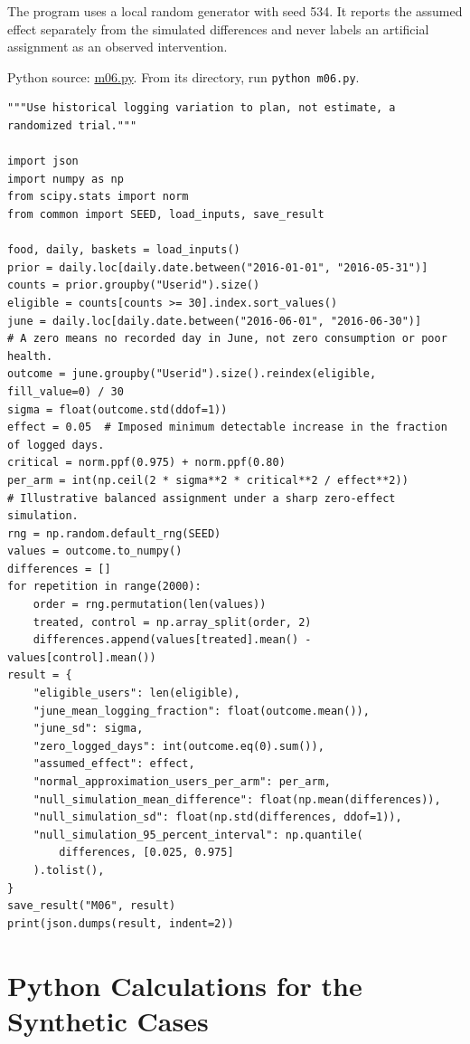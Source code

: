 The program uses a local random generator with seed 534. It reports the
assumed effect separately from the simulated differences and never
labels an artificial assignment as an observed intervention.

\FloatBarrier
{}
Python source:
\href{../03_Data_and_Code/mHealth/recurring_examples/m06.py}{m06.py}.
From its directory, run \texttt{python\ m06.py}.

\begin{Verbatim}[breaklines,breakanywhere,fontsize=\small]
"""Use historical logging variation to plan, not estimate, a randomized trial."""

import json
import numpy as np
from scipy.stats import norm
from common import SEED, load_inputs, save_result

food, daily, baskets = load_inputs()
prior = daily.loc[daily.date.between("2016-01-01", "2016-05-31")]
counts = prior.groupby("Userid").size()
eligible = counts[counts >= 30].index.sort_values()
june = daily.loc[daily.date.between("2016-06-01", "2016-06-30")]
# A zero means no recorded day in June, not zero consumption or poor health.
outcome = june.groupby("Userid").size().reindex(eligible, fill_value=0) / 30
sigma = float(outcome.std(ddof=1))
effect = 0.05  # Imposed minimum detectable increase in the fraction of logged days.
critical = norm.ppf(0.975) + norm.ppf(0.80)
per_arm = int(np.ceil(2 * sigma**2 * critical**2 / effect**2))
# Illustrative balanced assignment under a sharp zero-effect simulation.
rng = np.random.default_rng(SEED)
values = outcome.to_numpy()
differences = []
for repetition in range(2000):
    order = rng.permutation(len(values))
    treated, control = np.array_split(order, 2)
    differences.append(values[treated].mean() - values[control].mean())
result = {
    "eligible_users": len(eligible),
    "june_mean_logging_fraction": float(outcome.mean()),
    "june_sd": sigma,
    "zero_logged_days": int(outcome.eq(0).sum()),
    "assumed_effect": effect,
    "normal_approximation_users_per_arm": per_arm,
    "null_simulation_mean_difference": float(np.mean(differences)),
    "null_simulation_sd": float(np.std(differences, ddof=1)),
    "null_simulation_95_percent_interval": np.quantile(
        differences, [0.025, 0.975]
    ).tolist(),
}
save_result("M06", result)
print(json.dumps(result, indent=2))
\end{Verbatim}

\hypertarget{M06-python-calculations-for-the-synthetic-cases}{%
\section{Python Calculations for the Synthetic
Cases}\label{M06-python-calculations-for-the-synthetic-cases}}

